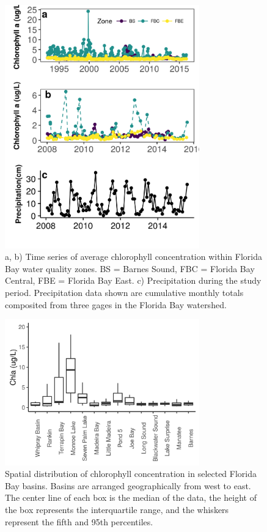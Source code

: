 \newpage

\begin{figure}
  \centering
  \includegraphics[width=0.75\textwidth]{../../figures/chltimeseries.png}
  \caption{a, b) Time series of average chlorophyll concentration within Florida Bay water quality zones. BS = Barnes Sound, FBC = Florida Bay Central, FBE = Florida Bay East. c) Precipitation during the study period. Precipitation data shown are cumulative monthly totals composited from three gages in the Florida Bay watershed.}
  \label{fig:2}
\end{figure}

\newpage

\begin{figure}
  \centering
  \includegraphics[width=0.75\textwidth]{../../figures/chlboxplot.png}
  \caption{Spatial distribution of chlorophyll concentration in selected Florida Bay basins. Basins are arranged geographically from west to east. The center line of each box is the median of the data, the height of the box represents the interquartile range, and the whiskers represent the fifth and 95th percentiles. }
  \label{fig:3}
\end{figure}


